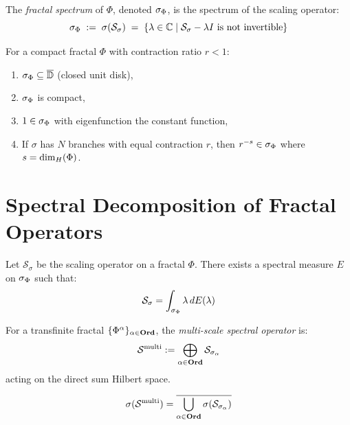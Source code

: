 \begin{definition}
\label{def:frac-spectrum}
The \emph{fractal spectrum} of $\Phi$, denoted $\sigma_\Phi$, is the
spectrum of the scaling operator:
\[
    \sigma_\Phi \;:=\; \sigma(\mathcal{S}_\sigma) \;=\;
    \{\lambda \in \mathbb{C} \mid \mathcal{S}_\sigma - \lambda I
    \text{ is not invertible}\}
\]
\end{definition}

\begin{theorem}
\label{thm:spectral-structure}
For a compact fractal $\Phi$ with contraction ratio $r < 1$:
\begin{enumerate}[label=(\alph*)]
    \item $\sigma_\Phi \subseteq \overline{\mathbb{D}}$ (closed unit disk),
    \item $\sigma_\Phi$ is compact,
    \item $1 \in \sigma_\Phi$ with eigenfunction the constant function,
    \item If $\sigma$ has $N$ branches with equal contraction $r$, then
          $r^{-s} \in \sigma_\Phi$ where $s = \dim_H(\Phi)$.
\end{enumerate}
\end{theorem}

\section{Spectral Decomposition of Fractal Operators}

\begin{theorem}
\label{thm:spectral-decomp}
Let $\mathcal{S}_\sigma$ be the scaling operator on a fractal $\Phi$. There
exists a spectral measure $E$ on $\sigma_\Phi$ such that:
\[
    \mathcal{S}_\sigma = \int_{\sigma_\Phi} \lambda \, dE(\lambda)
\]
\end{theorem}

\begin{definition}
\label{def:multi-scale-spectral}
For a transfinite fractal $\{\Phi^{\alpha}\}_{\alpha \in \mathbf{Ord}}$,
the \emph{multi-scale spectral operator} is:
\[
    \mathcal{S}^{\mathrm{multi}} := \bigoplus_{\alpha \in \mathbf{Ord}} \mathcal{S}_{\sigma_\alpha}
\]
acting on the direct sum Hilbert space.
\end{definition}

\begin{theorem}
\label{thm:multi-scale-spectrum}
\[
    \sigma(\mathcal{S}^{\mathrm{multi}}) = \overline{\bigcup_{\alpha \in \mathbf{Ord}}
    \sigma(\mathcal{S}_{\sigma_\alpha})}
\]
\end{theorem}

